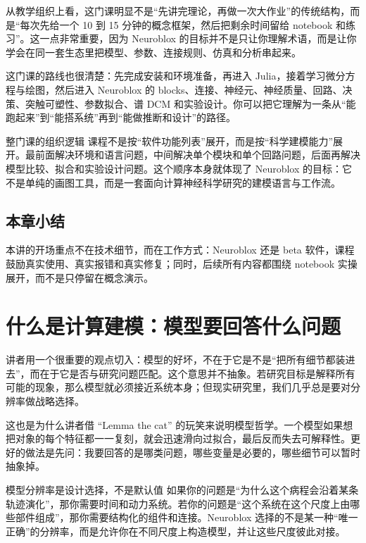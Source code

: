 \documentclass[a4paper]{article}
\begin{document}
从教学组织上看，这门课明显不是“先讲完理论，再做一次大作业”的传统结构，而是“每次先给一个 10 到 15 分钟的概念框架，然后把剩余时间留给 notebook 和练习”。这一点非常重要，因为 Neuroblox 的目标并不是只让你理解术语，而是让你学会在同一套生态里把模型、参数、连接规则、仿真和分析串起来。

这门课的路线也很清楚：先完成安装和环境准备，再进入 Julia，接着学习微分方程与绘图，然后进入 Neuroblox 的 blocks、连接、神经元、神经质量、回路、决策、突触可塑性、参数拟合、谱 DCM 和实验设计。你可以把它理解为一条从“能跑起来”到“能搭系统”再到“能做推断和设计”的路径。

\begin{knowledgebox}{整门课的组织逻辑}
课程不是按“软件功能列表”展开，而是按“科学建模能力”展开。最前面解决环境和语言问题，中间解决单个模块和单个回路问题，后面再解决模型比较、拟合和实验设计问题。这个顺序本身就体现了 Neuroblox 的目标：它不是单纯的画图工具，而是一套面向计算神经科学研究的建模语言与工作流。
\end{knowledgebox}

\subsection{本章小结}
本讲的开场重点不在技术细节，而在工作方式：Neuroblox 还是 beta 软件，课程鼓励真实使用、真实报错和真实修复；同时，后续所有内容都围绕 notebook 实操展开，而不是只停留在概念演示。

\section{什么是计算建模：模型要回答什么问题}
讲者用一个很重要的观点切入：模型的好坏，不在于它是不是“把所有细节都装进去”，而在于它是否与研究问题匹配。这个意思并不抽象。若研究目标是解释所有可能的现象，那么模型就必须接近系统本身；但现实研究里，我们几乎总是要对分辨率做战略选择。

这也是为什么讲者借 “Lemma the cat” 的玩笑来说明模型哲学。一个模型如果想把对象的每个特征都一一复刻，就会迅速滑向过拟合，最后反而失去可解释性。更好的做法是先问：我要回答的是哪类问题，哪些变量是必要的，哪些细节可以暂时抽象掉。

\begin{knowledgebox}{模型分辨率是设计选择，不是默认值}
如果你的问题是“为什么这个病程会沿着某条轨迹演化”，那你需要时间和动力系统。若你的问题是“这个系统在这个尺度上由哪些部件组成”，那你需要结构化的组件和连接。Neuroblox 选择的不是某一种“唯一正确”的分辨率，而是允许你在不同尺度上构造模型，并让这些尺度彼此对接。
\end{knowledgebox}
\end{document}
